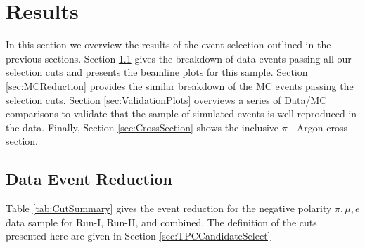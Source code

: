 \section{Results}\label{sec:Results}
In this section we overview the results of the event selection outlined in the previous sections. Section \ref{sec:DataReduction} gives the breakdown of data events passing all our selection cuts and presents the beamline plots for this sample. Section \ref{sec:MCReduction} provides the similar breakdown of the MC events passing the selection cuts. Section \ref{sec:ValidationPlots} overviews a series of Data/MC comparisons to validate that the sample of simulated events is well reproduced in the data. Finally, Section \ref{sec:CrossSection} shows the inclusive $\pi^{-}$-Argon cross-section.


\subsection{Data Event Reduction} \label{sec:DataReduction}
Table \ref{tab:CutSummary} gives the event reduction for the negative polarity $\pi, \mu, e$ data sample for Run-I, Run-II, and combined. The definition of the cuts presented here are given in Section \ref{sec:TPCCandidateSelect}

\begin{table}[htb]
	\begin{center}
	\caption{Summary of the events passing the inclusive pion selection criteria.} \label{tab:CutSummary}
	\end{center}
\end{table}

